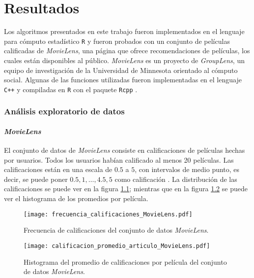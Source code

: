 
\chapter{Resultados}

Los algoritmos presentados en este trabajo fueron implementados en el lenguaje para cómputo estadístico \texttt{R} \cite{R_manual} y fueron probados con un conjunto de películas calificadas de \textit{MovieLens}, una página que ofrece recomendaciones de películas, los cuales están disponibles al público. \textit{MovieLens} es un proyecto de \textit{GroupLens}, un equipo de investigación de la Universidad de Minnesota orientado al cómputo social. Algunas de las funciones utilizadas fueron implementadas en el lenguaje \texttt{C++} y compiladas en \texttt{R} con el paquete \texttt{Rcpp} \cite{Rcpp_Book_Eddelbuettel} \cite{Rcpp_Article_Eddelbuettel_Francois}.

\subsection{Análisis exploratorio de datos}

\subsubsection{\textit{MovieLens}}

El conjunto de datos de \textit{MovieLens} consiste en  calificaciones de  películas hechas por  usuarios. Todos los usuarios habían calificado al menos 20 películas. Las calificaciones están en una escala de $0.5$ a $5$, con intervalos de medio punto, es decir, se puede poner $0.5, 1, \hdots, 4.5, 5$ como calificación \cite{harper2016movielens}. La distribución de las calificaciones se puede ver en la figura \ref{fig:ML_frec_calificaciones}; mientras que en la figura \ref{fig:ML_hist_prom_cals} se puede ver el histograma de los promedios por película.

\begin{figure}[H]
	\centering
 	\texttt{[image: frecuencia\_calificaciones\_MovieLens.pdf]}
 	\caption{Frecuencia de calificaciones del conjunto de datos \textit{MovieLens}.}
 	\label{fig:ML_frec_calificaciones}
\end{figure}

\begin{figure}[H]
	\centering
 	\texttt{[image: calificacion\_promedio\_articulo\_MovieLens.pdf]}
 	\caption{Histograma del promedio de calificaciones por película del conjunto de datos \textit{MovieLens}.}
 	\label{fig:ML_hist_prom_cals}
\end{figure}


